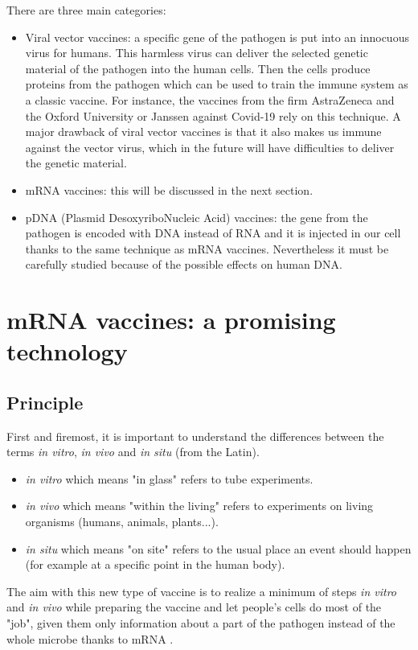 \documentclass{article}
\begin{document}
            There are three main categories:
            \begin{itemize}
                \item Viral vector vaccines: a specific gene of the pathogen is put into an innocuous virus for humans. 
                        This harmless virus can deliver the selected genetic material of the pathogen into the human cells.
                        Then the cells produce proteins from the pathogen which can be used to train the immune system as a classic vaccine.
                        For instance, the vaccines from the firm AstraZeneca and the Oxford University or Janssen against Covid-19 rely on this technique.
                        A major drawback of viral vector vaccines is that it also makes us immune against the vector virus, 
                            which in the future will have difficulties to deliver the genetic material.
                \item mRNA vaccines: this will be discussed in the next section.
                \item pDNA (Plasmid DesoxyriboNucleic Acid) vaccines: the gene from the pathogen is encoded with DNA instead of RNA
                    and it is injected in our cell thanks to the same technique as mRNA vaccines.
                    Nevertheless it must be carefully studied because of the possible effects on human DNA.
            \end{itemize}


    \section{mRNA vaccines: a promising technology}

        \subsection{Principle}

                First and firemost, it is important to understand the differences between the terms \emph{in vitro}, \emph{in vivo} and \emph{in situ} (from the Latin).
                \begin{itemize}
                    \item \emph{in vitro} which means "in glass" refers to tube experiments.
                    \item \emph{in vivo} which means "within the living" refers to experiments on living organisms (humans, animals, plants...).
                    \item \emph{in situ} which means "on site" refers to the usual place an event should happen (for example at a specific point in the human body).
                \end{itemize}
                The aim with this new type of vaccine is to realize a minimum of steps \emph{in vitro} and \emph{in vivo} while preparing the vaccine and
                    let people's cells do most of the "job", given them only information about a part of the pathogen instead of the whole microbe thanks
                    to mRNA \autocite{maruggiMRNATransformativeTechnology2019}.             
\end{document}
